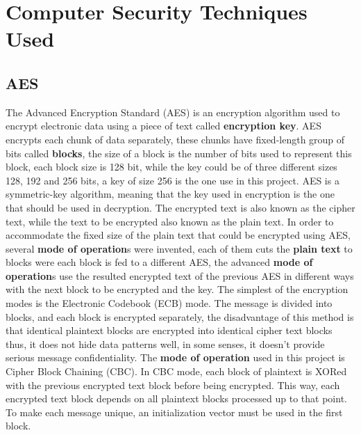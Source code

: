 \chapter{Computer Security Techniques Used}
\section{AES}
The Advanced Encryption Standard (AES) is an encryption algorithm used to encrypt electronic data using a piece of text called \textbf{encryption key}. AES encrypts each chunk of data separately, these chunks have fixed-length group of bits called \textbf{blocks}, the size of a block is the number of bits used to represent this block, each block size is 128 bit, while the key could be of three different sizes 128, 192 and 256 bits, a key of size 256 is the one use in this project. AES is a symmetric-key algorithm, meaning that the key used in encryption is the one that should be used in decryption. The encrypted text is also known as the cipher text, while the text to be encrypted also known as the plain text. In order to accommodate the fixed size of the plain text that could be encrypted using AES, several \textbf{mode of operation}s were invented, each of them cuts the \textbf{plain text} to blocks were each block is fed to a different AES, the advanced \textbf{mode of operation}s use the resulted encrypted text of the previous AES in different ways with the next block to be encrypted and the key. The simplest of the encryption modes is the Electronic Codebook (ECB) mode. The message is divided into blocks, and each block is encrypted separately, the disadvantage of this method is that identical plaintext blocks are encrypted into identical cipher text blocks thus, it does not hide data patterns well, in some senses, it doesn't provide serious message confidentiality. The \textbf{mode of operation} used in this project is Cipher Block Chaining (CBC). In CBC mode, each block of plaintext is XORed with the previous encrypted text block before being encrypted. This way, each encrypted text block depends on all plaintext blocks processed up to that point. To make each message unique, an initialization vector must be used in the first block.
\pagebreak
